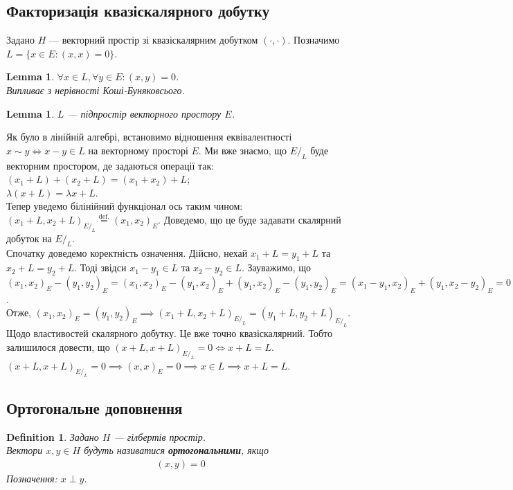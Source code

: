 \documentclass[a4paper, 10pt]{article}
\theoremstyle{theoremdd}
\theoremstyle{theoremdd}
\newtheorem{definition}[theorem]{Definition}
\theoremstyle{theoremdd}
\theoremstyle{theoremdd}
\theoremstyle{theoremdd}
\theoremstyle{theoremdd}
\theoremstyle{theoremdd}
\newtheorem{lemma}[theorem]{Lemma}
\theoremstyle{theoremdd}
\begin{document}
\subsection{Факторизація квазіскалярного добутку}
Задано $H$ --- векторний простір зі квазіскалярним добутком $(\cdot,\cdot)$. Позначимо $L = \{x \in E: (x,x) = 0\}$.

\begin{lemma}
$\forall x \in L, \forall y \in E: (x,y) = 0$.\\
\textit{Випливає з нерівності Коші-Буняковсього}.
\end{lemma}

\begin{lemma}
$L$ --- підпростір векторного простору $E$.
\end{lemma}
\noindent
Як було в лінійній алгебрі, встановимо відношення еквівалентності $x \sim y \iff x - y \in L$ на векторному просторі $E$. Ми вже знаємо, що $E/_L$ буде векторним простором, де задаються операції так:\\
$(x_1+L) + (x_2+L) = (x_1+x_2) + L$;\\
$\lambda(x+L) = \lambda x + L$.\\
Тепер уведемо білінійний функціонал ось таким чином: $(x_1+L,x_2+L)_{E/_L} \overset{\text{def.}}{=} (x_1,x_2)_E$. Доведемо, що це буде задавати скалярний добуток на $E/_L$.\\
Спочатку доведемо коректність означення. Дійсно, нехай $x_1+L = y_1+L$ та $x_2+L = y_2+L$. Тоді звідси $x_1-y_1 \in L$ та $x_2-y_2 \in L$. Зауважимо, що\\
$(x_1,x_2)_E - (y_1,y_2)_E = (x_1,x_2)_E - (y_1,x_2)_E + (y_1,x_2)_E - (y_1,y_2)_E = (x_1-y_1,x_2)_E + (y_1,x_2-y_2)_E = 0$.\\
Отже, $(x_1,x_2)_E = (y_1,y_2)_E \implies (x_1+L,x_2+L)_{E/_L} = (y_1+L,y_2+L)_{E/_L}$.\\
Щодо властивостей скалярного добутку. Це вже точно квазіскалярний. Тобто залишилося довести, що $(x+L,x+L)_{E/_L} = 0 \iff x+L = L$.\\
$(x+L,x+L)_{E/_L} = 0 \implies (x,x)_E = 0 \implies x \in L \implies x+L = L$.
 
\subsection{Ортогональне доповнення}
\begin{definition}
Задано $H$ --- гілбертів простір.\\
Вектори $x,y \in H$ будуть називатися \textbf{ортогональними}, якщо
\begin{align*}
(x,y) = 0
\end{align*}
Позначення: $x \perp y$.
\end{definition}
\end{document}
